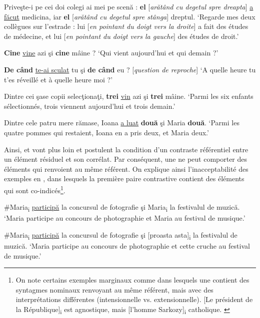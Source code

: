 \ex Priveşte-i pe cei doi colegi ai mei pe scenă : \textbf{el} [\textit{arătând cu degetul spre dreapta}] \uline{a făcut} medicina, iar \textbf{el} [\textit{arătând cu degetul spre stânga}] dreptul.
\glt ‘Regarde mes deux collègues sur l’estrade : lui [\textit{en pointant du doigt vers la droite}] a fait des études de médecine, et lui [\textit{en pointant du doigt vers la gauche}] des études de droit.’ 
\z
\z

\ea \label{ch2:ex154}
\ea \textbf{Cine} \uline{vine} azi şi \textbf{cine} mâine ?
\glt ‘Qui vient aujourd’hui et qui demain ?’  

\ex \textbf{De când} \uline{te-ai sculat} tu şi \textbf{de când} eu ?  [\textit{question de reproche}]
\glt ‘A quelle heure tu t’es réveillé et à quelle heure moi ?’
\z
\z

\ea \label{ch2:ex155}
\ea Dintre cei şase copii selecţionaţi, \textbf{trei} \uline{vin} azi şi \textbf{trei} mâine.
\glt ‘Parmi les six enfants sélectionnés, trois viennent aujourd’hui et trois demain.’ 

\ex Dintre cele patru mere rămase, Ioana \uline{a luat} \textbf{două} şi Maria \textbf{două}.
\glt ‘Parmi les quatre pommes qui restaient, Ioana en a pris deux, et Maria deux.’
\z
\z

Ainsi, \citet{Hartmann2000} et \citet{Repp2009} vont plus loin et postulent la condition d’un contraste référentiel entre un élément résiduel et son corrélat. Par conséquent, une  ne peut comporter des éléments qui renvoient au même référent. On explique ainsi l’inacceptabilité des exemples en , dans lesquels la première paire contrastive contient des éléments qui sont co-indicés\footnote{
 On note certains exemples marginaux comme  dans lesquels une  contient des syntagmes nominaux renvoyant au même référent, mais avec des interprétations différentes (intensionnelle vs. extensionnelle). 
 \ea {} [Le président de la République]\textsubscript{i} est agnostique, mais [l’homme Sarkozy]\textsubscript{i} catholique. \label{ch2:foot50i}
 \z
}.

\ea \label{ch2:ex156}
\ea \#Maria\textsubscript{i} \uline{participă} la concursul de fotografie şi Maria\textsubscript{i} la festivalul de muzică.
\glt ‘Maria participe au concours de photographie et Maria au festival de musique.’  

\ex \#Maria\textsubscript{i} \uline{participă} la concursul de fotografie şi [proasta asta]\textsubscript{i} la festivalul de muzică. 
\glt ‘Maria participe au concours de photographie et cette cruche au festival de musique.’
\z
\z

